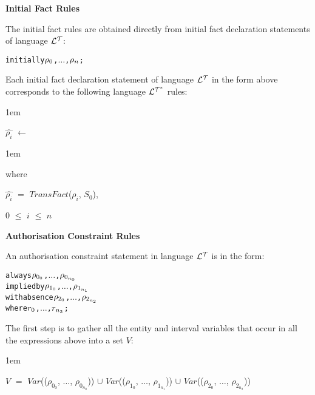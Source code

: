 \documentclass[11pt]{report}
\newenvironment{vverbatim}
{
  \begin{alltt}
}
{
  \vspace{-\baselineskip}
  \end{alltt}
}
\newenvironment{vquote}
{
  \begin{list}{}{\leftmargin 1em}\item[]
}
{
  \end{list}
}
\begin{document}
\begin{itemize}
            \item
              {\bf Initial Fact Rules}

              The initial fact rules are obtained directly from initial fact
              declaration statements of language ${\cal L^T}$:

              \begin{vverbatim}
  initially \(\rho\sb{0}\), \(\ldots\), \(\rho\sb{n}\);
              \end{vverbatim}

              Each initial fact declaration statement of language ${\cal L^T}$
              in the form above corresponds to the following language
              ${\cal L^{T^*}}$ rules:

              \begin{vquote}
                $\hat{\rho_i}$ $\leftarrow$
              \end{vquote}

              \begin{vquote}
                where

                \hspace{1em}
                $\hat{\rho_i}$ $=$ $TransFact$($\rho_i$, $S_0$),

                \hspace{1em}
                $0$ $\leq$ $i$ $\leq$ $n$
              \end{vquote}

            \item
              {\bf Authorisation Constraint Rules}

              An authorisation constraint statement in language ${\cal L^T}$
              is in the form:

              \begin{vverbatim}
  always \(\rho\sb{0\sb{0}}\), \(\ldots\), \(\rho\sb{0\sb{n\sb{0}}}\)
    implied by \(\rho\sb{1\sb{0}}\), \(\ldots\), \(\rho\sb{1\sb{n\sb{1}}}\)
    with absence \(\rho\sb{2\sb{0}}\), \(\ldots\), \(\rho\sb{2\sb{n\sb{2}}}\)
    where \(r\sb{0}\), \(\ldots\), \(r\sb{n\sb{3}}\);
              \end{vverbatim}

              The first step is to gather all the entity and interval
              variables that occur in all the expressions above into a set $V$:

              \begin{vquote}
                $V$ $=$
                $Var$(($\rho_{0_0}$, $\ldots$, $\rho_{0_{n_0}}$)) $\cup$
                $Var$(($\rho_{1_0}$, $\ldots$, $\rho_{1_{n_1}}$)) $\cup$
                $Var$(($\rho_{2_0}$, $\ldots$, $\rho_{2_{n_2}}$))
              \end{vquote}


\end{itemize}
\end{document}

